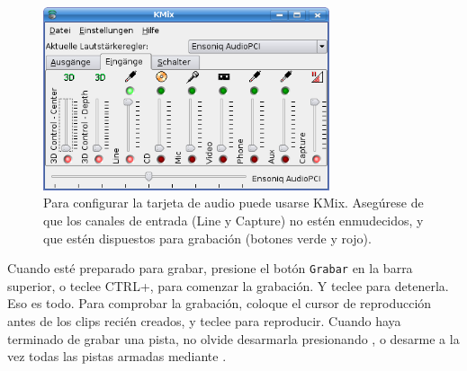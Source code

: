 \begin{figure}
 \centering\includegraphics[width=0.75\textwidth]{../images/kmix01.png}
 \caption{Para configurar la tarjeta de audio puede usarse KMix. Asegúrese de que los canales de entrada (Line y Capture) no estén enmudecidos, y que estén dispuestos para grabación (botones verde y rojo).}
 \label{fig_kmix01}
\end{figure}

Cuando esté preparado para grabar, presione el botón \texttt{Grabar} en la barra superior, o teclee CTRL+, para comenzar la grabación. Y teclee  para detenerla. Eso es todo. Para comprobar la grabación, coloque el cursor de reproducción antes de los clips recién creados, y teclee  para reproducir. Cuando haya terminado de grabar una pista, no olvide desarmarla presionando , o desarme a la vez todas las pistas armadas mediante .


